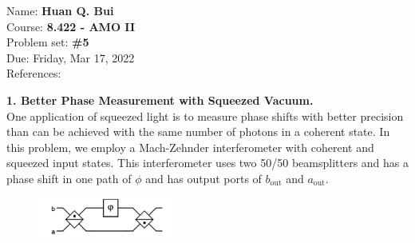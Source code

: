 \documentclass{article}
\theoremstyle{definition}
\begin{document}
\begin{framed}
\noindent Name: \textbf{Huan Q. Bui}\\
Course: \textbf{8.422 - AMO II}\\
Problem set: \textbf{\#5}\\
Due: Friday, Mar 17, 2022\\
References: 
\end{framed}
	


\noindent \textbf{1. Better Phase Measurement with Squeezed Vacuum.}\\

\noindent One application of squeezed light is to measure phase shifts with better precision than can be
achieved with the same number of photons in a coherent state.  In this problem, we employ a
Mach-Zehnder interferometer with coherent and squeezed input states. This interferometer uses two 50/50 beamsplitters and has a phase shift in one path of $\phi$ and has output ports of $b_\text{out}$ and $a_\text{out}$. 

\begin{figure}[!htb]
\centering
\includegraphics[width=0.4\textwidth]{figures/BS.png}
\end{figure}
\end{document}

